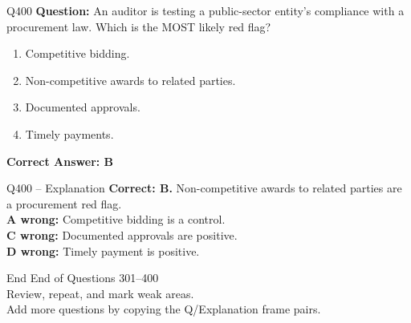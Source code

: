 \documentclass[aspectratio=169,10pt]{beamer}
\begin{document}
	\begin{frame}[t]{Q400}
		\small
		\textbf{Question:} An auditor is testing a public-sector entity's compliance with a procurement law. Which is the MOST likely red flag?
		\begin{enumerate}[label=\Alph*.,itemsep=1pt,topsep=2pt]
			\item Competitive bidding.
			\item Non-competitive awards to related parties.
			\item Documented approvals.
			\item Timely payments.
		\end{enumerate}
		\vspace{4pt}
		\textbf{Correct Answer: B}
	\end{frame}
	
	\begin{frame}[t]{Q400 -- Explanation}
		\small
		\textbf{Correct: B.} Non-competitive awards to related parties are a procurement red flag. \\[4pt]
		\textbf{A wrong:} Competitive bidding is a control. \\[2pt]
		\textbf{C wrong:} Documented approvals are positive. \\[2pt]
		\textbf{D wrong:} Timely payment is positive.
	\end{frame}
	
	\begin{frame}{End}
		\centering
		\Large End of Questions 301--400\\[8pt]
		\normalsize Review, repeat, and mark weak areas.\\[4pt]
		\small Add more questions by copying the Q/Explanation frame pairs.
	\end{frame}
	
\end{document}
